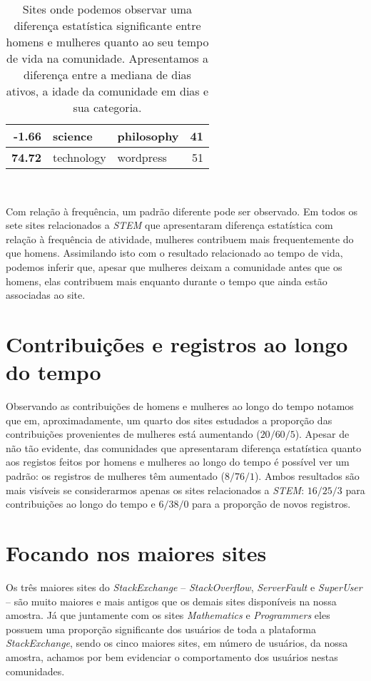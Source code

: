 \begin{table}[!b]
\begin{tabular}{@{}rllr@{}}
-1.66                             & science            & philosophy         & 41                 \\ \midrule
\textbf{74.72}                             & technology         & wordpress          & 51                 \\ \bottomrule
\end{tabular}
\caption[Diferença de tempo de vida entre homens e mulheres]{Sites onde podemos observar uma diferença estatística significante entre homens e mulheres quanto ao seu tempo de vida na comunidade. Apresentamos a diferença entre a mediana de dias ativos, a idade da comunidade em dias e sua categoria.}~\label{table:lifetime}
\end{table}

Com relação à frequência, um padrão diferente pode ser observado. Em todos os sete sites relacionados a \emph{STEM} que apresentaram diferença estatística com relação à frequência de atividade, mulheres contribuem mais frequentemente do que homens. Assimilando isto com o resultado relacionado ao tempo de vida, podemos inferir que, apesar que mulheres deixam a comunidade antes que os homens, elas contribuem mais enquanto durante o tempo que ainda estão associadas ao site.


\section{Contribuições e registros ao longo do tempo}
Observando as contribuições de homens e mulheres ao longo do tempo notamos que em, aproximadamente, um quarto dos sites estudados a proporção das contribuições provenientes de mulheres está aumentando ($20/60/5$). Apesar de não tão evidente, das comunidades que apresentaram diferença estatística quanto aos registos feitos por homens e mulheres ao longo do tempo é possível ver um padrão: os registros de mulheres têm aumentado ($8/76/1$). Ambos resultados são mais visíveis se considerarmos apenas os sites relacionados a \emph{STEM}: $16/25/3$ para contribuições ao longo do tempo e $6/38/0$ para a proporção de novos registros.

\section{Focando nos maiores sites} 

Os três maiores sites do \emph{StackExchange} -- \emph{StackOverflow}, \emph{ServerFault} e \emph{SuperUser} -- são muito maiores e mais antigos que os demais sites disponíveis na nossa amostra. Já que juntamente com os sites \emph{Mathematics} e \emph{Programmers} eles possuem uma proporção significante dos usuários de toda a plataforma \emph{StackExchange}, sendo os cinco maiores sites, em número de usuários, da nossa amostra, achamos por bem evidenciar o comportamento dos usuários nestas comunidades. 

